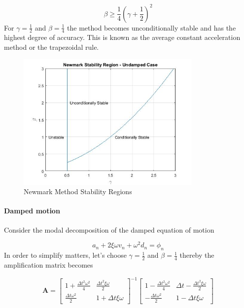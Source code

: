 \documentclass{article}
\begin{document}
				\begin{equation}
					\beta \geq \frac{1}{4}\left(\gamma + \frac{1}{2}\right)^2
				\end{equation}
For $\gamma = \frac{1}{2}$ and $\beta = \frac{1}{4}$ the method becomes unconditionally stable and has the highest degree of accuracy. This is known as the average constant acceleration method or the trapezoidal rule.

				\begin{figure}[h!]
   					 \centering
   					 \includegraphics[width=90mm]{pictures/GraphNM.jpg}
   					 \caption{Newmark Method Stability Regions}
				            \label{fig6}
  				\end{figure}

			\paragraph{Damped motion} Consider the modal decomposition of the damped equation of motion

				\begin{equation*}
					a_n + 2\xi\omega v_n + \omega^2 d_n = \phi_n
				\end{equation*}
In order to simplify matters, let's choose $\gamma = \frac{1}{2}$ and $\beta = \frac{1}{4}$ thereby the amplification matrix becomes

				\begin{equation*}
					\textbf{A} = \begin{bmatrix} 1+ \frac{\Delta t^2 \omega^2}{4} & \frac{\Delta t^2 \xi \omega}{2} \\
\frac{\Delta t \omega^2}{2}& 1 + \Delta t \xi \omega\end{bmatrix}^{-1}\begin{bmatrix} 1 -\frac{\Delta t^2 \omega^2}{4} & \Delta t -  \frac{\Delta t^2 \xi \omega}{2} \\ -\frac{\Delta t \omega^2}{2} & 1 - \Delta t \xi \omega \end{bmatrix}
				\end{equation*}
\end{document}
